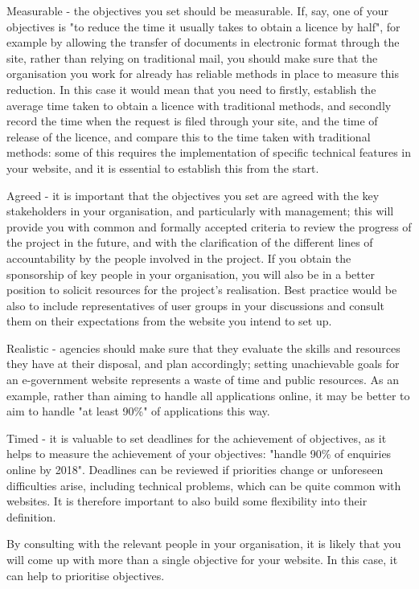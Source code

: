 Measurable - the objectives you set should be measurable. If, say, one of your objectives is "to reduce the time it usually takes to obtain a licence by half", for example by allowing the transfer of documents in electronic format through the site, rather than relying on traditional mail, you should make sure that the organisation you work for already has reliable methods in place to measure this reduction. In this case it would mean that you need to firstly, establish the average time taken to obtain a licence with traditional methods, and secondly record the time when the request is filed through your site, and the time of release of the licence, and compare this to the time taken with traditional methods: some of this requires the implementation of specific technical features in your website, and it is essential to establish this from the start.

Agreed - it is important that the objectives you set are agreed with the key stakeholders in your organisation, and particularly with management; this will provide you with common and formally accepted criteria to review the progress of the project in the future, and with the clarification of the different lines of accountability by the people involved in the project. If you obtain the sponsorship of key people in your organisation, you will also be in a better position to solicit resources for the project's realisation. Best practice would be also to include representatives of user groups in your discussions and consult them on their expectations from the website you intend to set up.

Realistic - agencies should make sure that they evaluate the skills and resources they have at their disposal, and plan accordingly; setting unachievable goals for an e-government website represents a waste of time and public resources. As an example, rather than aiming to handle all applications online, it may be better to aim to handle "at least 90\%" of applications this way.

Timed - it is valuable to set deadlines for the achievement of objectives, as it helps to measure the achievement of your objectives: "handle 90\% of enquiries online by 2018". Deadlines can be reviewed if priorities change or unforeseen difficulties arise, including technical problems, which can be quite common with websites. It is therefore important to also build some flexibility into their definition.

By consulting with the relevant people in your organisation, it is likely that you will come up with more than a single objective for your website. In this case, it can help to prioritise objectives.

